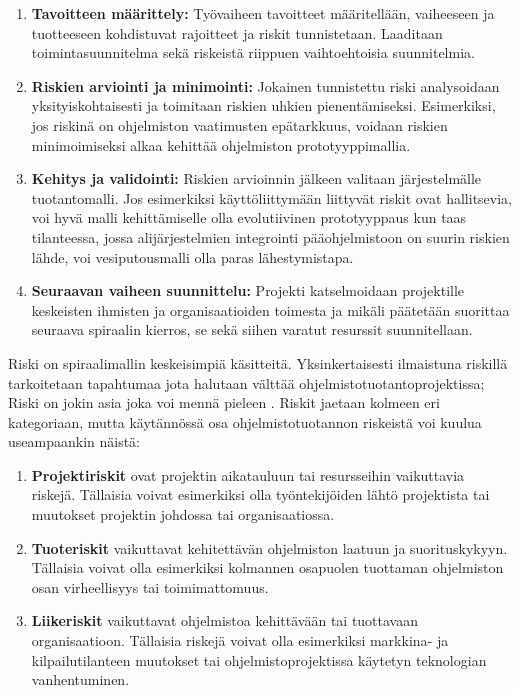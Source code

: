 \documentclass[finnish,12pt]{tktltiki2}
\theoremstyle{definition}
\theoremstyle{remark}
\begin{document}
\begin{enumerate}
\item \textbf{Tavoitteen määrittely:} Työvaiheen tavoitteet määritellään, vaiheeseen ja tuotteeseen kohdistuvat rajoitteet ja riskit tunnistetaan. Laaditaan toimintasuunnitelma sekä riskeistä riippuen vaihtoehtoisia suunnitelmia.
\item \textbf{Riskien arviointi ja minimointi:} Jokainen tunnistettu riski analysoidaan yksityiskohtaisesti ja toimitaan riskien uhkien pienentämiseksi. Esimerkiksi, jos riskinä on ohjelmiston vaatimusten epätarkkuus, voidaan riskien minimoimiseksi alkaa kehittää ohjelmiston prototyyppimallia. 
\item \textbf{Kehitys ja validointi:} Riskien arvioinnin jälkeen valitaan järjestelmälle tuotantomalli. Jos esimerkiksi käyttöliittymään liittyvät riskit ovat hallitsevia, voi hyvä malli kehittämiselle olla evolutiivinen prototyyppaus kun taas tilanteessa, jossa alijärjestelmien integrointi pääohjelmistoon on suurin riskien lähde, voi vesiputousmalli olla paras lähestymistapa.
\item \textbf{Seuraavan vaiheen suunnittelu: } Projekti katselmoidaan projektille keskeisten ihmisten ja organisaatioiden toimesta ja mikäli päätetään suorittaa seuraava spiraalin kierros, se sekä siihen varatut resurssit suunnitellaan.
\end{enumerate}

Riski on spiraalimallin keskeisimpiä käsitteitä. Yksinkertaisesti ilmaistuna riskillä tarkoitetaan tapahtumaa jota halutaan välttää ohjelmistotuotantoprojektissa; Riski on jokin asia joka voi mennä pieleen \cite{Sommerville10}. Riskit jaetaan kolmeen eri kategoriaan, mutta käytännössä osa ohjelmistotuotannon riskeistä voi kuulua useampaankin näistä:

\begin{enumerate}
\item \textbf{Projektiriskit} ovat projektin aikatauluun tai resursseihin vaikuttavia riskejä. Tällaisia voivat esimerkiksi olla työntekijöiden lähtö projektista tai muutokset projektin johdossa tai organisaatiossa.
\item \textbf{Tuoteriskit} vaikuttavat kehitettävän ohjelmiston laatuun ja suorituskykyyn. Tällaisia voivat olla esimerkiksi kolmannen osapuolen tuottaman ohjelmiston osan virheellisyys tai toimimattomuus.
\item \textbf{Liikeriskit} vaikuttavat ohjelmistoa kehittävään tai tuottavaan organisaatioon. Tällaisia riskejä voivat olla esimerkiksi markkina- ja kilpailutilanteen muutokset tai ohjelmistoprojektissa käytetyn teknologian vanhentuminen. 
\end{enumerate}
\end{document}
